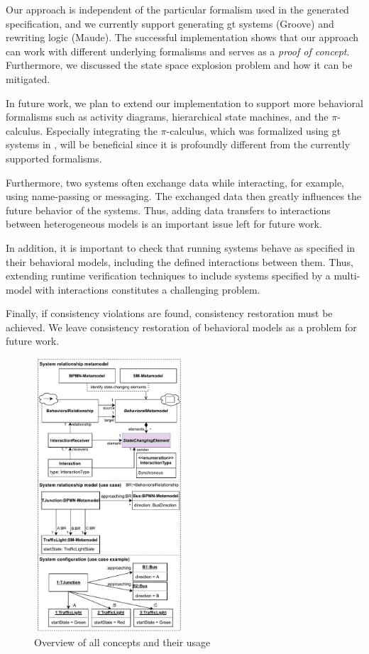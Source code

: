 \documentclass{jot}
\begin{document}
Our approach is independent of the particular formalism used in the generated specification, and we currently support generating \gls*{gt} systems (Groove) and rewriting logic (Maude).
The successful implementation shows that our approach can work with different underlying formalisms and serves as a \emph{proof of concept}.
Furthermore, we discussed the state space explosion problem and how it can be mitigated.

In future work, we plan to extend our implementation to support more behavioral formalisms such as activity diagrams, hierarchical state machines, and the $\pi$-calculus.
Especially integrating the $\pi$-calculus, which was formalized using \gls*{gt} systems in \cite{gadducciGraphRewritingPcalculus2007}, will be beneficial since it is profoundly different from the currently supported formalisms.

Furthermore, two systems often exchange data while interacting, for example, using name-passing or messaging.
The exchanged data then greatly influences the future behavior of the systems.
Thus, adding data transfers to interactions between heterogeneous models is an important issue left for future work.

In addition, it is important to check that running systems behave as specified in their behavioral models, including the defined interactions between them.
Thus, extending runtime verification techniques to include systems specified by a multi-model with interactions constitutes a challenging problem.

Finally, if consistency violations are found, consistency restoration must be achieved.
We leave consistency restoration of behavioral models as a problem for future work.

\begin{figure}[ht!]
    \centering
    \includegraphics[width=0.5\textwidth]{figures/allConcepts.pdf}
    \caption{Overview of all concepts and their usage}
    \label{fig:allConcepts}
\end{figure}
\end{document}
